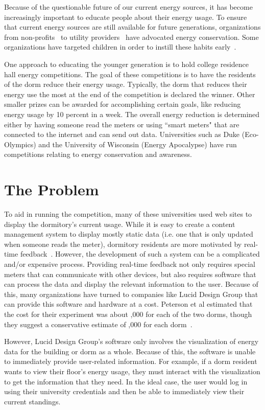 Because of the questionable future of our current energy sources, it has become increasingly important to educate people about their energy usage.  To ensure that current energy sources are still available for future generations, organizations from non-profits~\cite{blueplanet} to utility providers~\cite{heco} have advocated energy conservation.  Some organizations have targeted children in order to instill these habits early~\cite{energyhog}.

One approach to educating the younger generation is to hold college residence hall energy competitions.  The goal of these competitions is to have the residents of the dorm reduce their energy usage.  Typically, the dorm that reduces their energy use the most at the end of the competition is declared the winner.  Other smaller prizes can be awarded for accomplishing certain goals, like reducing energy usage by 10 percent in a week.  The overall energy reduction is determined either by having someone read the meters or using ``smart meters" that are connected to the internet and can send out data.  Universities such as Duke (Eco-Olympics) and the University of Wisconsin (Energy Apocalypse) have run competitions relating to energy conservation and awareness. 

\section{The Problem}

To aid in running the competition, many of these universities used web sites to display the dormitory's current usage.  While it is easy to create a content management system to display mostly static data (i.e. one that is only updated when someone reads the meter), dormitory residents are more motivated by real-time feedback~\cite{oberlin-feedback}.  However, the development of such a system can be a complicated and/or expensive process.  Providing real-time feedback not only requires special meters that can communicate with other devices, but also requires software that can process the data and display the relevant information to the user.  Because of this, many organizations have turned to companies like Lucid Design Group that can provide this software and hardware at a cost.  Peterson et al estimated that the cost for their experiment was about ,000 for each of the two dorms, though they suggest a conservative estimate of ,000 for each dorm~\cite{oberlin-feedback}.

However, Lucid Design Group's software only involves the visualization of energy data for the building or dorm as a whole.  Because of this, the software is unable to immediately provide user-related information.  For example, if a dorm resident wants to view their floor's energy usage, they must interact with the visualization to get the information that they need.  In the ideal case, the user would log in using their university credentials and then be able to immediately view their current standings.

